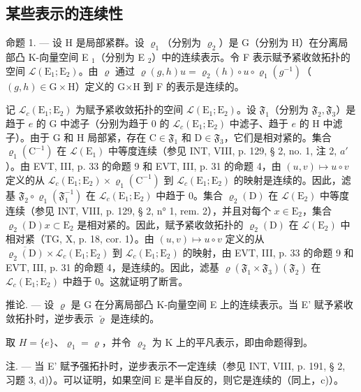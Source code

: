 \subsection{某些表示的连续性}

命题 1. — 设 H 是局部紧群。设 \(\varrho_{1}\)（分别为 \(\varrho_{2}\)）是 G（分别为 H）在分离局部凸 K-向量空间 E \(_{1}\)（分别为 E \(_{2}\)）中的连续表示。令 F 表示赋予紧收敛拓扑的空间 \(\mathcal{L}(\mathrm{E}_{1};\mathrm{E}_{2})\)。由 \(\varrho\) 通过 \(\varrho(g,h)u=\varrho_{2}(h)\circ u\circ\varrho_{1}(g^{-1})\)（\((g,h)\in\mathrm{G}\times\mathrm{H}\)）定义的 G×H 到 F 的表示是连续的。

记 \(\mathcal{L}_c(\mathrm{E}_1;\mathrm{E}_2)\) 为赋予紧收敛拓扑的空间 \(\mathcal{L}(\mathrm{E}_1;\mathrm{E}_2)\)。设 \(\mathfrak{F}_1\)（分别为 \(\mathfrak{F}_2,\mathfrak{F}_3\)）是趋于 \(e\) 的 G 中滤子（分别为趋于 0 的 \(\mathcal{L}_c(\mathrm{E}_1;\mathrm{E}_2)\) 中滤子、趋于 \(e\) 的 H 中滤子）。由于 G 和 H 局部紧，存在 \(\mathrm{C}\in \mathfrak{F}_1\) 和 \(\mathrm{D}\in \mathfrak{F}_3\)，它们是相对紧的。集合 \(\varrho_1(\mathrm{C}^{-1})\) 在 \(\mathcal{L}(\mathrm{E}_1)\) 中等度连续（参见 INT, VIII, p. 129, § 2, no. 1, 注 2, \(a'\)）。由 EVT, III, p. 33 的命题 9 和 EVT, III, p. 31 的命题 4，由 \((u,v)\mapsto u\circ v\) 定义的从 \(\mathcal{L}_c(\mathrm{E}_1;\mathrm{E}_2)\times \varrho_1(\mathrm{C}^{-1})\) 到 \(\mathcal{L}_c(\mathrm{E}_1;\mathrm{E}_2)\) 的映射是连续的。因此，滤基 \(\mathfrak{F}_2\circ \varrho_1(\mathfrak{F}_1^{-1})\) 在 \(\mathcal{L}_c(\mathrm{E}_1;\mathrm{E}_2)\) 中趋于 0。集合 \(\varrho_2(\mathrm{D})\) 在 \(\mathcal{L}(\mathrm{E}_2)\) 中等度连续（参见 INT, VIII, p. 129, § 2, n° 1, rem. 2），并且对每个 \(x\in \mathrm{E}_2\)，集合 \(\varrho_2(\mathrm{D})x\subset \mathrm{E}_2\) 是相对紧的。因此，赋予紧收敛拓扑的 \(\varrho_2(\mathrm{D})\) 在 \(\mathcal{L}(\mathrm{E}_2)\) 中相对紧（TG, X, p. 18, cor. 1）。由 \((u,v)\mapsto u\circ v\) 定义的从 \(\overline{\varrho_2(\mathrm{D})}\times \mathcal{L}_c(\mathrm{E}_1;\mathrm{E}_2)\) 到 \(\mathcal{L}_c(\mathrm{E}_1;\mathrm{E}_2)\) 的映射，由 EVT, III, p. 33 的命题 9 和 EVT, III, p. 31 的命题 4，是连续的。因此，滤基 \(\varrho (\mathfrak{F}_1\times \mathfrak{F}_3)(\mathfrak{F}_2)\) 在 \(\mathcal{L}_c(\mathrm{E}_1;\mathrm{E}_2)\) 中趋于 0。这就证明了断言。

推论. --- 设 \(\varrho\) 是 G 在分离局部凸 K-向量空间 E 上的连续表示。当 E' 赋予紧收敛拓扑时，逆步表示 \(\breve{\varrho}\) 是连续的。

取 \(H = \{e\}\)、\(\varrho_{1} = \varrho\)，并令 \(\varrho_{2}\) 为 K 上的平凡表示，即由命题得到。

注. --- 当 E' 赋予强拓扑时，逆步表示不一定连续（参见 INT, VIII, p. 191, § 2, 习题 3, d)）。可以证明，如果空间 E 是半自反的，则它是连续的（同上，c)）。

